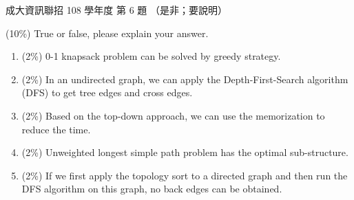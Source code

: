 \begin{pastexam}[label={px:ncku-108-prog-06}]{成大資訊聯招 108 學年度 第 6 題}
（是非；要說明）

(10\%) True or false, please explain your answer.
\begin{enumerate}[label=(\alph*)]
\item (2\%) 0-1 knapsack problem can be solved by greedy strategy.
\item (2\%) In an undirected graph, we can apply the Depth-First-Search algorithm (DFS) to get tree
edges and cross edges.
\item (2\%) Based on the top-down approach, we can use the memorization to reduce the time.
\item (2\%) Unweighted longest simple path problem has the optimal sub-structure.
\item (2\%) If we first apply the topology sort to a directed graph and then run the DFS algorithm on
this graph, no back edges can be obtained.
\end{enumerate}
\end{pastexam}

